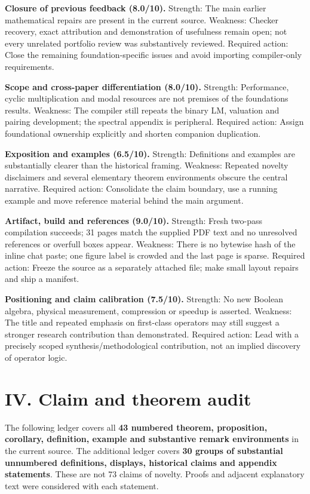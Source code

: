 \documentclass[
  10pt,
]{article}
\begin{document}
\textbf{Closure of previous feedback (8.0/10).} Strength: The main
earlier mathematical repairs are present in the current source.
Weakness: Checker recovery, exact attribution and demonstration of
usefulness remain open; not every unrelated portfolio review was
substantively reviewed. Required action: Close the remaining
foundation-specific issues and avoid importing compiler-only
requirements.

\textbf{Scope and cross-paper differentiation (8.0/10).} Strength:
Performance, cyclic multiplication and modal resources are not premises
of the foundations results. Weakness: The compiler still repeats the
binary LM, valuation and pairing development; the spectral appendix is
peripheral. Required action: Assign foundational ownership explicitly
and shorten companion duplication.

\textbf{Exposition and examples (6.5/10).} Strength: Definitions and
examples are substantially clearer than the historical framing.
Weakness: Repeated novelty disclaimers and several elementary theorem
environments obscure the central narrative. Required action: Consolidate
the claim boundary, use a running example and move reference material
behind the main argument.

\textbf{Artifact, build and references (9.0/10).} Strength: Fresh
two-pass compilation succeeds; 31 pages match the supplied PDF text and
no unresolved references or overfull boxes appear. Weakness: There is no
bytewise hash of the inline chat paste; one figure label is crowded and
the last page is sparse. Required action: Freeze the source as a
separately attached file; make small layout repairs and ship a manifest.

\textbf{Positioning and claim calibration (7.5/10).} Strength: No new
Boolean algebra, physical measurement, compression or speedup is
asserted. Weakness: The title and repeated emphasis on first-class
operators may still suggest a stronger research contribution than
demonstrated. Required action: Lead with a precisely scoped
synthesis/methodological contribution, not an implied discovery of
operator logic.

\section{IV. Claim and theorem audit}\label{iv.-claim-and-theorem-audit}

The following ledger covers all \textbf{43 numbered theorem,
proposition, corollary, definition, example and substantive remark
environments} in the current source. The additional ledger covers
\textbf{30 groups of substantial unnumbered definitions, displays,
historical claims and appendix statements}. These are not 73 claims of
novelty. Proofs and adjacent explanatory text were considered with each
statement.
\end{document}
